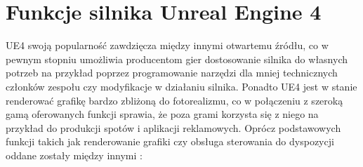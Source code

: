 \documentclass[multip]{SGGW-thesis}
\begin{document}
\section{Funkcje silnika Unreal Engine 4}
UE4 swoją popularność zawdzięcza między innymi otwartemu źródłu, co w pewnym stopniu umożliwia producentom gier dostosowanie silnika do własnych potrzeb na przykład poprzez programowanie narzędzi dla mniej technicznych członków zespołu czy modyfikacje w działaniu silnika. Ponadto UE4 jest w stanie renderować grafikę bardzo zbliżoną do fotorealizmu, co w połączeniu z szeroką gamą oferowanych funkcji sprawia, że poza grami korzysta się z niego na przykład do produkcji spotów i aplikacji reklamowych. \cite{the-human-race}\cite{ikea-vr}
\newline
\newline Oprócz podstawowych funkcji takich jak renderowanie grafiki czy obsługa sterowania do dyspozycji oddane zostały między innymi \cite{docs-ue4-features}:
\end{document}
